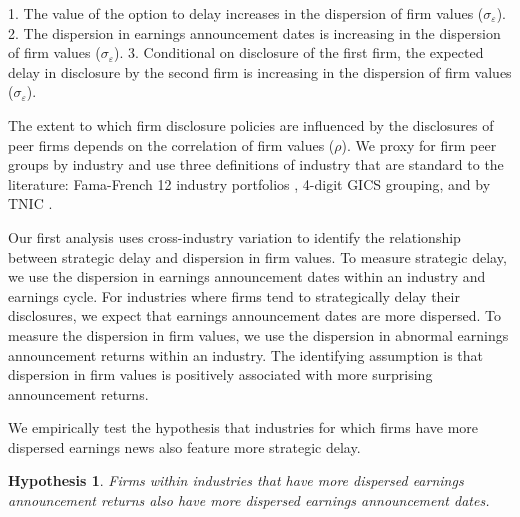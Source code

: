 \documentclass[ecta,nameyear,draft]{econsocart}
\theoremstyle{theorem}
\newtheorem{hypothesis}{Hypothesis}
\numberwithin{lemma}{section}
\numberwithin{proposition}{section}
\numberwithin{equation}{section}
\numberwithin{figure}{section}
\begin{document}
1. The value of the option to delay increases in the dispersion of firm values ($\sigma_\varepsilon$). 
2. The dispersion in earnings announcement dates is increasing in the dispersion of firm values ($\sigma_\varepsilon$).  
3. Conditional on disclosure of the first firm, the expected delay in disclosure by the second firm is increasing in the dispersion of firm values ($\sigma_\varepsilon$).

The extent to which firm disclosure policies are influenced by the disclosures of peer firms depends on the correlation of firm values ($\rho$). We proxy for firm peer groups by industry and use three definitions of industry that are standard to the literature: Fama-French 12 industry portfolios \citep{fama1997industry}, 4-digit GICS grouping, and by TNIC \citep{hoberg2010product,hoberg2016text}.

Our first analysis uses cross-industry variation to identify the relationship between strategic delay and dispersion in firm values. To measure strategic delay, we use the dispersion in earnings announcement dates within an industry and earnings cycle. For industries where firms tend to strategically delay their disclosures, we expect that earnings announcement dates are more dispersed. To measure the dispersion in firm values, we use the dispersion in abnormal earnings announcement returns within an industry. The identifying assumption is that dispersion in firm values is positively associated with more surprising announcement returns. 

We empirically test the hypothesis that industries for which firms have more dispersed earnings news also feature more strategic delay. 
\begin{hypothesis}\label{hyp:crossindustry}
Firms within industries that have more dispersed earnings announcement returns also have more dispersed earnings announcement dates. 
\end{hypothesis}
\end{document}
